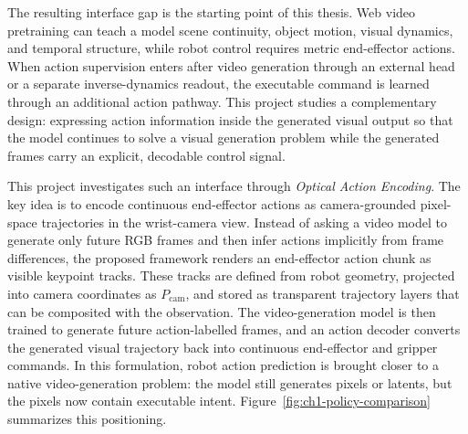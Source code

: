 The resulting interface gap is the starting point of this thesis. Web video pretraining can teach a model scene continuity, object motion, visual dynamics, and temporal structure, while robot control requires metric end-effector actions. When action supervision enters after video generation through an external head or a separate inverse-dynamics readout, the executable command is learned through an additional action pathway. This project studies a complementary design: expressing action information inside the generated visual output so that the model continues to solve a visual generation problem while the generated frames carry an explicit, decodable control signal.

This project investigates such an interface through \emph{Optical Action Encoding}. The key idea is to encode continuous end-effector actions as camera-grounded pixel-space trajectories in the wrist-camera view. Instead of asking a video model to generate only future RGB frames and then infer actions implicitly from frame differences, the proposed framework renders an end-effector action chunk as visible keypoint tracks. These tracks are defined from robot geometry, projected into camera coordinates as \(P_{\mathrm{cam}}\), and stored as transparent trajectory layers that can be composited with the observation. The video-generation model is then trained to generate future action-labelled frames, and an action decoder converts the generated visual trajectory back into continuous end-effector and gripper commands. In this formulation, robot action prediction is brought closer to a native video-generation problem: the model still generates pixels or latents, but the pixels now contain executable intent. Figure~\ref{fig:ch1-policy-comparison} summarizes this positioning.


